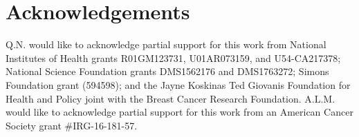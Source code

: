 \documentclass[11pt]{article}
\begin{document}
\section*{Acknowledgements}
Q.N. would like to acknowledge partial support for this work from National Institutes of Health grants R01GM123731, U01AR073159, and U54-CA217378; National Science Foundation grants DMS1562176 and DMS1763272; Simons Foundation grant (594598); and the Jayne Koskinas Ted Giovanis Foundation for Health and Policy joint with the Breast Cancer Research Foundation. A.L.M. would like to acknowledge partial support for this work from an American Cancer Society grant \#IRG-16-181-57.




\end{document}
